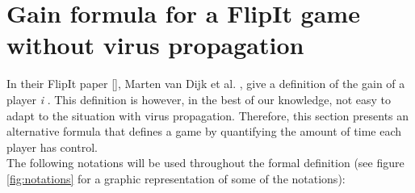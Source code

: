 \section{Gain formula for a FlipIt game without virus propagation}
\label{ch:8:GainFlip}
In their FlipIt paper [], Marten van Dijk et al. , give a definition of the gain of a player \textit{i} . This definition is however, in the best of our knowledge, not easy to adapt to the situation with virus propagation. Therefore, this section presents an alternative formula that defines a game by quantifying the amount of time each player has control. \\


The following notations will be used throughout the formal definition (see figure \ref{fig:notations} for a graphic representation of some of the notations):

